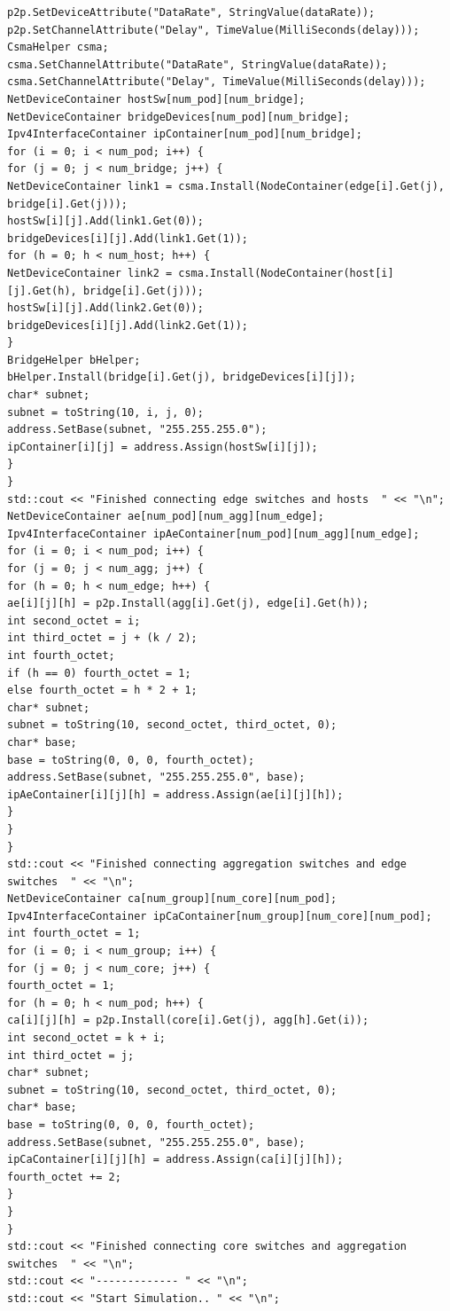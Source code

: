 \documentclass[lang=cn,11pt,a4paper,cite=authoryear]{elegantpaper}
\begin{document}
\begin{lstlisting}
p2p.SetDeviceAttribute("DataRate", StringValue(dataRate));
p2p.SetChannelAttribute("Delay", TimeValue(MilliSeconds(delay)));
CsmaHelper csma;
csma.SetChannelAttribute("DataRate", StringValue(dataRate));
csma.SetChannelAttribute("Delay", TimeValue(MilliSeconds(delay)));
NetDeviceContainer hostSw[num_pod][num_bridge];
NetDeviceContainer bridgeDevices[num_pod][num_bridge];
Ipv4InterfaceContainer ipContainer[num_pod][num_bridge];
for (i = 0; i < num_pod; i++) {
for (j = 0; j < num_bridge; j++) {
NetDeviceContainer link1 = csma.Install(NodeContainer(edge[i].Get(j), bridge[i].Get(j)));
hostSw[i][j].Add(link1.Get(0));
bridgeDevices[i][j].Add(link1.Get(1));
for (h = 0; h < num_host; h++) {
NetDeviceContainer link2 = csma.Install(NodeContainer(host[i][j].Get(h), bridge[i].Get(j)));
hostSw[i][j].Add(link2.Get(0));
bridgeDevices[i][j].Add(link2.Get(1));
}
BridgeHelper bHelper;
bHelper.Install(bridge[i].Get(j), bridgeDevices[i][j]);
char* subnet;
subnet = toString(10, i, j, 0);
address.SetBase(subnet, "255.255.255.0");
ipContainer[i][j] = address.Assign(hostSw[i][j]);
}
}
std::cout << "Finished connecting edge switches and hosts  " << "\n";
NetDeviceContainer ae[num_pod][num_agg][num_edge];
Ipv4InterfaceContainer ipAeContainer[num_pod][num_agg][num_edge];
for (i = 0; i < num_pod; i++) {
for (j = 0; j < num_agg; j++) {
for (h = 0; h < num_edge; h++) {
ae[i][j][h] = p2p.Install(agg[i].Get(j), edge[i].Get(h));
int second_octet = i;
int third_octet = j + (k / 2);
int fourth_octet;
if (h == 0) fourth_octet = 1;
else fourth_octet = h * 2 + 1;
char* subnet;
subnet = toString(10, second_octet, third_octet, 0);
char* base;
base = toString(0, 0, 0, fourth_octet);
address.SetBase(subnet, "255.255.255.0", base);
ipAeContainer[i][j][h] = address.Assign(ae[i][j][h]);
}
}
}
std::cout << "Finished connecting aggregation switches and edge switches  " << "\n";
NetDeviceContainer ca[num_group][num_core][num_pod];
Ipv4InterfaceContainer ipCaContainer[num_group][num_core][num_pod];
int fourth_octet = 1;
for (i = 0; i < num_group; i++) {
for (j = 0; j < num_core; j++) {
fourth_octet = 1;
for (h = 0; h < num_pod; h++) {
ca[i][j][h] = p2p.Install(core[i].Get(j), agg[h].Get(i));
int second_octet = k + i;
int third_octet = j;
char* subnet;
subnet = toString(10, second_octet, third_octet, 0);
char* base;
base = toString(0, 0, 0, fourth_octet);
address.SetBase(subnet, "255.255.255.0", base);
ipCaContainer[i][j][h] = address.Assign(ca[i][j][h]);
fourth_octet += 2;
}
}
}
std::cout << "Finished connecting core switches and aggregation switches  " << "\n";
std::cout << "------------- " << "\n";
std::cout << "Start Simulation.. " << "\n";

\end{lstlisting}
\end{document}
